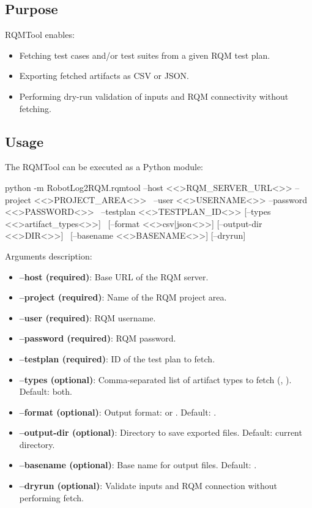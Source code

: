 \subsection{Purpose}
RQMTool enables:

\begin{itemize}
  \item Fetching test cases and/or test suites from a given RQM test plan.
  \item Exporting fetched artifacts as CSV or JSON.
  \item Performing dry-run validation of inputs and RQM connectivity without fetching.
\end{itemize}

\subsection{Usage}
The RQMTool can be executed as a Python module:

\begin{robotlog}
python -m RobotLog2RQM.rqmtool --host <\textless{}>RQM_SERVER_URL<\textgreater{}> --project <\textless{}>PROJECT_AREA<\textgreater{}> \
                               --user <\textless{}>USERNAME<\textgreater{}> --password <\textless{}>PASSWORD<\textgreater{}> \
                               --testplan <\textless{}>TESTPLAN_ID<\textgreater{}> [--types <\textless{}>artifact_types<\textgreater{}>] \
                               [--format <\textless{}>csv|json<\textgreater{}>] [--output-dir <\textless{}>DIR<\textgreater{}>] \
                               [--basename <\textless{}>BASENAME<\textgreater{}>] [--dryrun]
\end{robotlog}

Arguments description:

\begin{itemize}
  \item \textbf{--host (required)}: Base URL of the RQM server.
  \item \textbf{--project (required)}: Name of the RQM project area.
  \item \textbf{--user (required)}: RQM username.
  \item \textbf{--password (required)}: RQM password.
  \item \textbf{--testplan (required)}: ID of the test plan to fetch.
  \item \textbf{--types (optional)}: Comma-separated list of artifact types to fetch
        (\rcode{testcase}, \rcode{testsuite}). Default: both.
  \item \textbf{--format (optional)}: Output format:  or . Default: .
  \item \textbf{--output-dir (optional)}: Directory to save exported files. Default: current directory.
  \item \textbf{--basename (optional)}: Base name for output files. Default: .
  \item \textbf{--dryrun (optional)}: Validate inputs and RQM connection without performing fetch.
\end{itemize}

